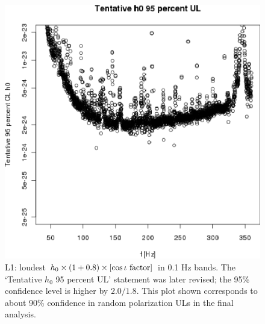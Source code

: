 \begin{figure}
\begin{center}
\includegraphics[width=0.68\paperwidth,height=0.48\paperheight]{plots/h0FullUL95logGuess-L1.eps}
\caption{
L1: loudest $h_0 \times \left( 1 + 0.8 \right) \times \left[\cos \iota \textup{ factor}\right]$ in 0.1 Hz bands. 
The `Tentative $h_0$ 95 percent UL' statement was later revised; the 95\% confidence level is higher by $2.0/1.8$.
This plot shown corresponds to about 90\% confidence in random polarization ULs in the final analysis.}
\label{S6_L1_UL}
\end{center}
\end{figure}

